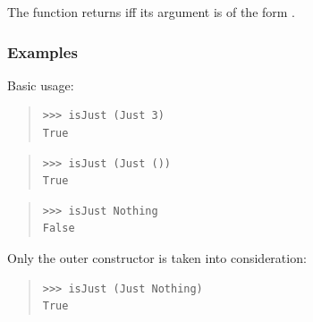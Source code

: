 \begin{haddockdesc}
\item[\begin{tabular}{@{}l}
isJust :: Maybe a -> Bool
\end{tabular}]
{\haddockbegindoc
The  function returns  iff its argument is of the
 form .\par
\subsubsection*{\textbf{Examples}}
Basic usage:\par
\begin{quote}
{\haddockverb\begin{verbatim}
>>> isJust (Just 3)
True

\end{verbatim}}
\end{quote}
\begin{quote}
{\haddockverb\begin{verbatim}
>>> isJust (Just ())
True

\end{verbatim}}
\end{quote}
\begin{quote}
{\haddockverb\begin{verbatim}
>>> isJust Nothing
False

\end{verbatim}}
\end{quote}
Only the outer constructor is taken into consideration:\par
\begin{quote}
{\haddockverb\begin{verbatim}
>>> isJust (Just Nothing)
True

\end{verbatim}}
\end{quote}}
\end{haddockdesc}
